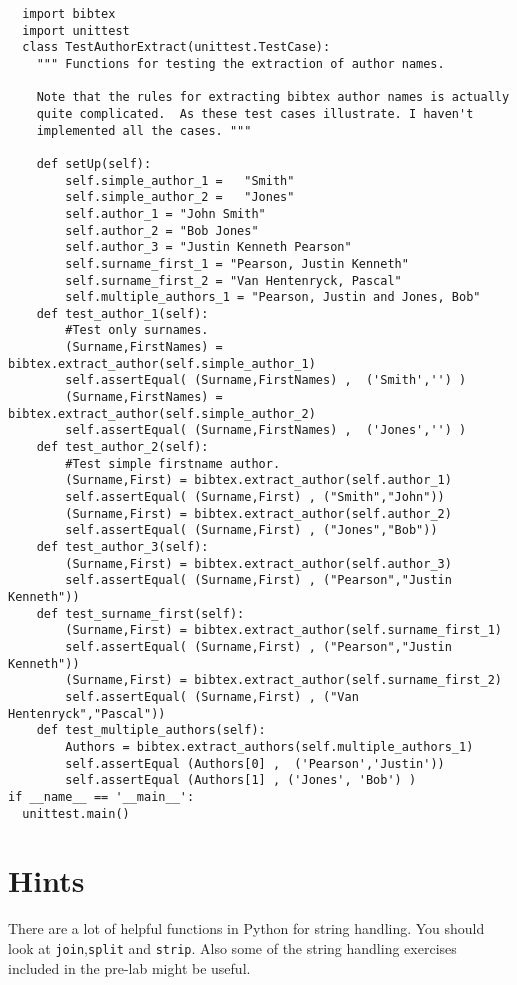 \documentclass[10pt]{paper}
\begin{document}
\begin{lstlisting}
  import bibtex
  import unittest
  class TestAuthorExtract(unittest.TestCase):
    """ Functions for testing the extraction of author names.

    Note that the rules for extracting bibtex author names is actually
    quite complicated.  As these test cases illustrate. I haven't
    implemented all the cases. """

    def setUp(self):
        self.simple_author_1 =   "Smith"
        self.simple_author_2 =   "Jones"
        self.author_1 = "John Smith"
        self.author_2 = "Bob Jones"
        self.author_3 = "Justin Kenneth Pearson"
        self.surname_first_1 = "Pearson, Justin Kenneth"
        self.surname_first_2 = "Van Hentenryck, Pascal"
        self.multiple_authors_1 = "Pearson, Justin and Jones, Bob"
    def test_author_1(self):
        #Test only surnames.
        (Surname,FirstNames) = bibtex.extract_author(self.simple_author_1)
        self.assertEqual( (Surname,FirstNames) ,  ('Smith','') )
        (Surname,FirstNames) = bibtex.extract_author(self.simple_author_2)
        self.assertEqual( (Surname,FirstNames) ,  ('Jones','') )
    def test_author_2(self):
        #Test simple firstname author.
        (Surname,First) = bibtex.extract_author(self.author_1)
        self.assertEqual( (Surname,First) , ("Smith","John"))
        (Surname,First) = bibtex.extract_author(self.author_2)
        self.assertEqual( (Surname,First) , ("Jones","Bob"))
    def test_author_3(self):
        (Surname,First) = bibtex.extract_author(self.author_3)
        self.assertEqual( (Surname,First) , ("Pearson","Justin Kenneth"))
    def test_surname_first(self):
        (Surname,First) = bibtex.extract_author(self.surname_first_1)
        self.assertEqual( (Surname,First) , ("Pearson","Justin Kenneth"))
        (Surname,First) = bibtex.extract_author(self.surname_first_2)
        self.assertEqual( (Surname,First) , ("Van Hentenryck","Pascal"))
    def test_multiple_authors(self):
        Authors = bibtex.extract_authors(self.multiple_authors_1)
        self.assertEqual (Authors[0] ,  ('Pearson','Justin'))
        self.assertEqual (Authors[1] , ('Jones', 'Bob') )
if __name__ == '__main__':
  unittest.main()
\end{lstlisting}


\section*{Hints}
There are a lot of helpful functions in Python for string handling. You
should look at \texttt{join},\texttt{split} and \texttt{strip}. Also some of
the string handling exercises included in the pre-lab might be useful. 



\end{document}
